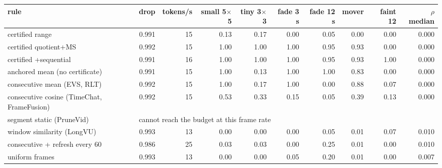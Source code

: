 \begin{tabular}{lrrrrrrrrr}
\toprule
rule & drop & tokens/s & small 5$\times$5 & tiny 3$\times$3 & fade 3 s & fade 12 s & mover & faint 12 & $\rho$ median \\
\midrule
certified range & 0.991 & 15 & 0.13 & 0.17 & 0.00 & 0.05 & 0.00 & 0.00 & 0.000 \\
certified quotient+MS & 0.992 & 15 & 1.00 & 1.00 & 1.00 & 0.95 & 0.93 & 0.00 & 0.000 \\
certified +sequential & 0.991 & 16 & 1.00 & 1.00 & 1.00 & 0.95 & 0.93 & 1.00 & 0.000 \\
anchored mean (no certificate) & 0.991 & 15 & 1.00 & 0.13 & 1.00 & 1.00 & 0.83 & 0.00 & 0.000 \\
consecutive mean (EVS, RLT) & 0.992 & 15 & 1.00 & 0.17 & 1.00 & 0.00 & 0.88 & 0.07 & 0.000 \\
consecutive cosine (TimeChat, FrameFusion) & 0.992 & 15 & 0.53 & 0.33 & 0.15 & 0.05 & 0.39 & 0.13 & 0.000 \\
segment static (PruneVid) & \multicolumn{9}{l}{cannot reach the budget at this frame rate} \\
window similarity (LongVU) & 0.993 & 13 & 0.00 & 0.00 & 0.00 & 0.05 & 0.01 & 0.07 & 0.010 \\
consecutive + refresh every 60 & 0.986 & 25 & 0.03 & 0.03 & 0.00 & 0.25 & 0.01 & 0.00 & 0.010 \\
uniform frames & 0.993 & 13 & 0.00 & 0.00 & 0.05 & 0.20 & 0.01 & 0.00 & 0.007 \\
\bottomrule
\end{tabular}
